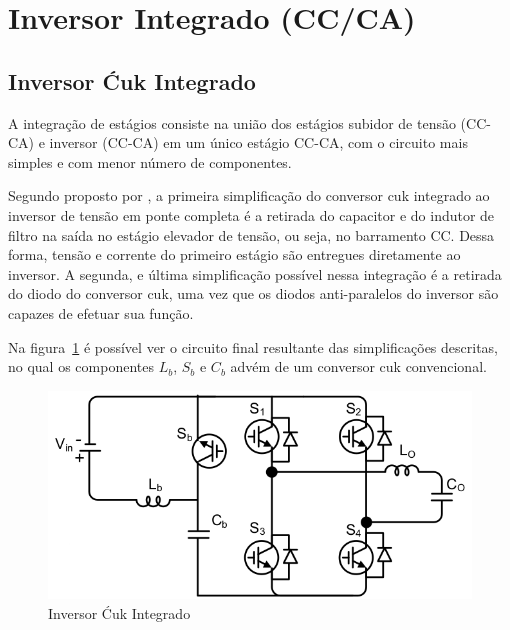 \documentclass[
	12pt,				%
	openright,			%
	twoside,			%
	a4paper,			%
	english,			%
	french,				%
	spanish,			%
	brazil,				%
	]{abntex2}
\begin{document}
\section{Inversor Integrado (CC/CA)}
\subsection{Inversor Ćuk Integrado}

A integração de estágios consiste na união dos estágios subidor de tensão (CC-CA) e inversor (CC-CA) em um único estágio CC-CA, com o circuito mais simples e com menor número de componentes. 

Segundo proposto por , a primeira simplificação do conversor cuk integrado ao inversor de tensão em ponte completa é a retirada do capacitor e do indutor de filtro na saída no estágio elevador de tensão, ou seja, no barramento CC. Dessa forma, tensão e corrente do primeiro estágio são entregues diretamente ao inversor. A segunda, e última simplificação possível nessa integração é a retirada do diodo do conversor cuk, uma vez que os diodos anti-paralelos do inversor são capazes de efetuar sua função.

Na figura~\ref{fig:integ_cuk_circ} é possível ver o circuito final resultante das simplificações descritas, no qual os componentes $L_b$, $S_b$ e $C_b$ advém de um conversor cuk convencional. 


\begin{figure}[H]
	\begin{center}
		\includegraphics[width=0.65 \linewidth]{integ_cuk_circ}
		\caption{Inversor Ćuk Integrado \cite{LUIGI_int_top}}
		\label{fig:integ_cuk_circ}
	\end{center}
\end{figure}

\end{document}
